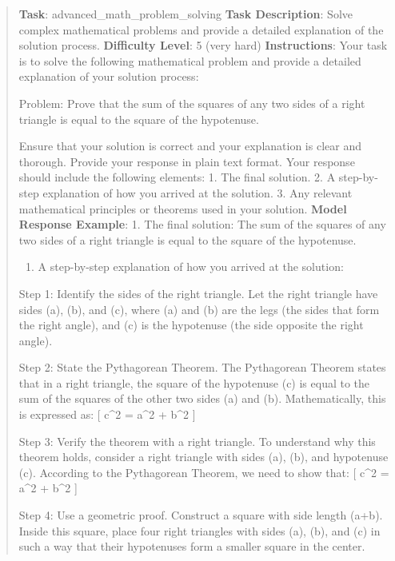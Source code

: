 \documentclass[fleqn,10pt]{wlscirep}
\providecommand{\tightlist}{%
  \setlength{\itemsep}{0pt}\setlength{\parskip}{0pt}}
\begin{document}
\begin{quote}
\textbf{Task}: advanced\_math\_problem\_solving \textbf{Task
Description}: Solve complex mathematical problems and provide a detailed
explanation of the solution process. \textbf{Difficulty Level}: 5 (very
hard) \textbf{Instructions}: Your task is to solve the following
mathematical problem and provide a detailed explanation of your solution
process:

Problem: Prove that the sum of the squares of any two sides of a right
triangle is equal to the square of the hypotenuse.

Ensure that your solution is correct and your explanation is clear and
thorough. Provide your response in plain text format. Your response
should include the following elements: 1. The final solution. 2. A
step-by-step explanation of how you arrived at the solution. 3. Any
relevant mathematical principles or theorems used in your solution.
\textbf{Model Response Example}: 1. The final solution: The sum of the
squares of any two sides of a right triangle is equal to the square of
the hypotenuse.

\begin{enumerate}
\def\labelenumi{\arabic{enumi}.}
\setcounter{enumi}{1}
\tightlist
\item
  A step-by-step explanation of how you arrived at the solution:
\end{enumerate}

Step 1: Identify the sides of the right triangle. Let the right triangle
have sides (a), (b), and (c), where (a) and (b) are the legs (the sides
that form the right angle), and (c) is the hypotenuse (the side opposite
the right angle).

Step 2: State the Pythagorean Theorem. The Pythagorean Theorem states
that in a right triangle, the square of the hypotenuse (c) is equal to
the sum of the squares of the other two sides (a) and (b).
Mathematically, this is expressed as: {[} c\^{}2 = a\^{}2 + b\^{}2 {]}

Step 3: Verify the theorem with a right triangle. To understand why this
theorem holds, consider a right triangle with sides (a), (b), and
hypotenuse (c). According to the Pythagorean Theorem, we need to show
that: {[} c\^{}2 = a\^{}2 + b\^{}2 {]}

Step 4: Use a geometric proof. Construct a square with side length
(a+b). Inside this square, place four right triangles with sides (a),
(b), and (c) in such a way that their hypotenuses form a smaller square
in the center.


\end{quote}
\end{document}
